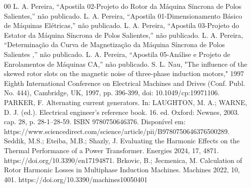 \documentclass[conference]{IEEEtran}
\begin{document}
\begin{thebibliography}{00}
 L. A. Pereira, ``Apostila 02-Projeto do Rotor da Máquina Síncrona de Polos Salientes,'' não publicado.
 L. A. Pereira, ``Apostila 01-Dimensionamento Básico de Máquinas Elétricas,'' não publicado.
 L. A. Pereira, ``Apostila 03-Projeto do Estator da Máquina Síncrona de Polos Salientes,'' não publicado.
 L. A. Pereira, ``Determinação da Curva de Magnetização da Máquina Síncrona de Polos Salientes ,'' não publicado.
 L. A. Pereira, ``Apostila 05-Análise e Projeto de Enrolamentos de Máquinas CA,'' não publicado.
 S. L. Nau, "The influence of the skewed rotor slots on the magnetic noise of three-phase induction motors," 1997 Eighth International Conference on Electrical Machines and Drives (Conf. Publ. No. 444), Cambridge, UK, 1997, pp. 396-399, doi: 10.1049/cp:19971106.
 PARKER, F. Alternating current generators. In: LAUGHTON, M. A.; WARNE, D. J. (ed.). Electrical engineer's reference book. 16. ed. Oxford: Newnes, 2003. cap. 28, p. 28-1–28-59. ISBN 9780750646376. Disponível em: https://www.sciencedirect.com/science/article/pii/B9780750646376500289.
 Seddik, M.S.; Eteiba, M.B.; Shazly, J. Evaluating the Harmonic Effects on the Thermal Performance of a Power Transformer. Energies 2024, 17, 4871. https://doi.org/10.3390/en17194871.
 Brkovic, B.; Jecmenica, M. Calculation of Rotor Harmonic Losses in Multiphase Induction Machines. Machines 2022, 10, 401. https://doi.org/10.3390/machines10050401


\end{thebibliography}
\end{document}
